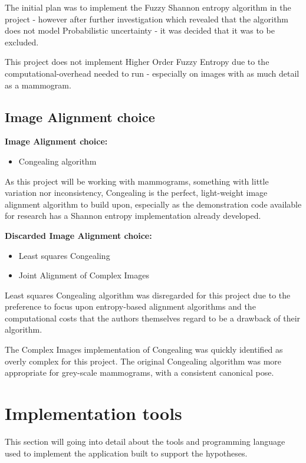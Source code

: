 The initial plan was to implement the Fuzzy Shannon entropy algorithm in the project - however after further investigation which revealed that the algorithm does not model Probabilistic uncertainty - it was decided that it was to be excluded.

This project does not implement Higher Order Fuzzy Entropy due to the computational-overhead needed to run - especially on images with as much detail as a mammogram.


\subsection{Image Alignment choice}

\textbf{Image Alignment choice:}
\begin{itemize}
    \item \Gls{Congealing} algorithm
\end{itemize}

As this project will be working with mammograms, something with little variation nor inconsistency, \Gls{Congealing} is the perfect, light-weight image alignment algorithm to build upon, especially as the demonstration code available for research has a Shannon entropy implementation already developed.

\textbf{Discarded Image Alignment choice:}
\begin{itemize}
    \item Least squares \gls{Congealing}
    \item Joint Alignment of Complex Images
\end{itemize}

Least squares \gls{Congealing} algorithm was disregarded for this project due to the preference to focus upon entropy-based alignment algorithms and the computational costs that the authors themselves regard to be a drawback of their algorithm.

The Complex Images implementation of \Gls{Congealing} was quickly identified as overly complex for this project. The original \Gls{Congealing} algorithm was more appropriate for grey-scale mammograms, with a consistent canonical pose.

\section{Implementation tools}

This section will going into detail about the tools and programming language used to implement the application built to support the hypotheses.

